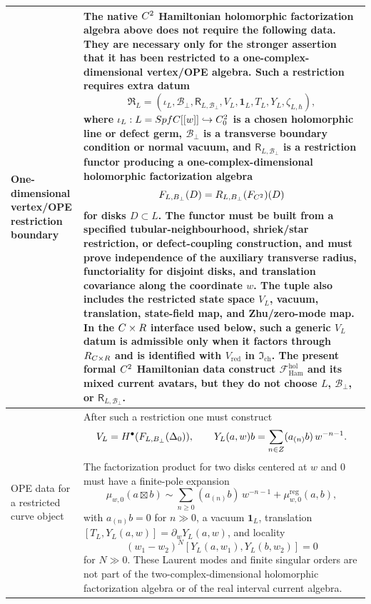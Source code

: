 \begin{longtable}{@{}>{\raggedright\arraybackslash}p{}
  >{\raggedright\arraybackslash}p{}@{}}
\hline
One-dimensional vertex/OPE restriction boundary &
The native \(C^2\) Hamiltonian holomorphic factorization algebra above does not require
the following data.  They are necessary only for the stronger assertion
that it has been restricted to a one-complex-dimensional vertex/OPE
algebra.  Such a restriction requires extra datum
\[
  \mathfrak R_L
  =
  (\iota_L,\mathcal B_\perp,\mathsf R_{L,\mathcal B_\perp},
   V_L,\mathbf 1_L,T_L,Y_L,\zeta_{L,\hbar}),
\]
where
\(\iota_L: L=SpfC[[w]]
\hookrightarrow C^2_0\) is a chosen holomorphic line or defect
germ, \(\mathcal B_\perp\) is a transverse boundary condition or normal
vacuum, and \(\mathsf R_{L,\mathcal B_\perp}\) is a restriction functor
producing a
one-complex-dimensional holomorphic factorization algebra
\[
  F_{L,B_\perp}(D)
  =
  R_{L,B_\perp}(F_{C^2})(D)
\]
for disks \(D\subset L\).  The functor must be built from a specified
tubular-neighbourhood, shriek/star restriction, or defect-coupling
construction, and must prove independence of the auxiliary transverse
radius, functoriality for disjoint disks, and translation covariance along
the coordinate \(w\).  The tuple also includes the restricted state
space \(V_L\), vacuum, translation, state-field map, and Zhu/zero-mode
map.  In the \(C\times R\) interface used below, such a generic \(V_L\)
datum is admissible only when it factors through
\(R_{C\times R}\) and is identified with
\(V_{\mathrm{red}}\) in \(\mathfrak I_{\mathrm{ch}}\).  The present
formal \(C^2\) Hamiltonian data
construct \(\mathcal F_{\mathrm{Ham}}^{\mathrm{hol}}\) and its mixed
current avatars, but they do not choose \(L\), \(\mathcal B_\perp\), or
\(\mathsf R_{L,\mathcal B_\perp}\).\\
\hline
OPE data for a restricted curve object &
After such a restriction one must construct
\[
  V_L=H^\bullet(F_{L,B_\perp}(\Delta_0)),
  \qquad
  Y_L(a,w)b=\sum_{n\in Z}(a_{(n)}b)\,w^{-n-1}.
\]
The factorization product for two disks centered at \(w\) and \(0\) must
have a finite-pole expansion
\[
  \mu_{w,0}(a\boxtimes b)
  \sim
  \sum_{n\ge0}(a_{(n)}b)\,w^{-n-1}
  +\mu^{\mathrm{reg}}_{w,0}(a,b),
\]
with \(a_{(n)}b=0\) for \(n\gg0\), a vacuum
\(\mathbf 1_L\), translation
\([T_L,Y_L(a,w)]=\partial_wY_L(a,w)\), and locality
\[
  (w_1-w_2)^N
  [Y_L(a,w_1),Y_L(b,w_2)]=0
\]
for \(N\gg0\).  These Laurent modes and finite singular orders are not
part of the two-complex-dimensional holomorphic factorization algebra or
of the real interval current algebra.\\

\end{longtable}
